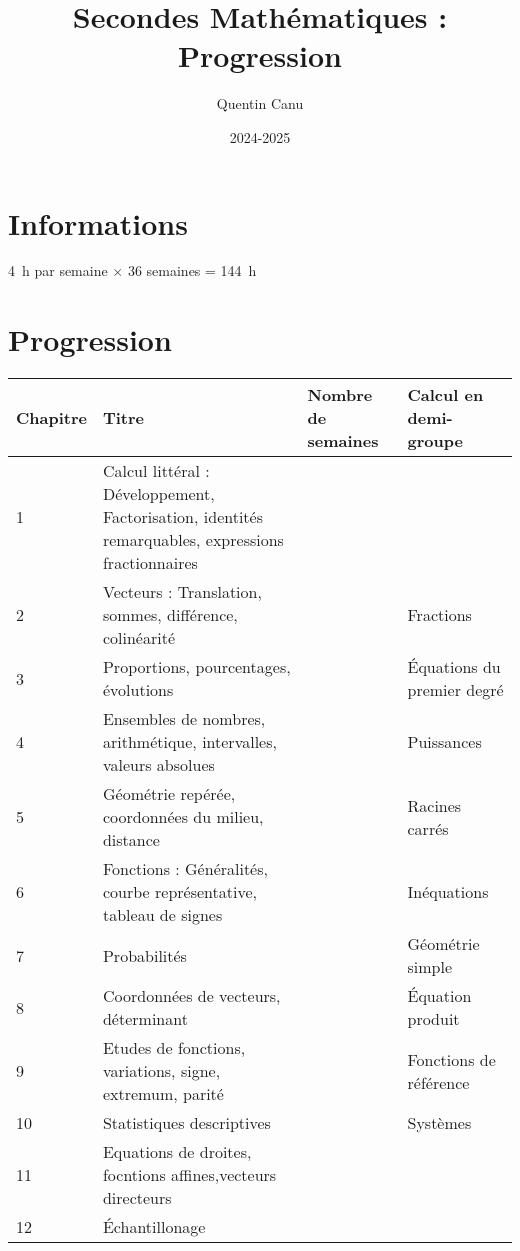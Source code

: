 \documentclass{article}
\title{Secondes Mathématiques : Progression}
\author{Quentin Canu}
\date{2024-2025}
\begin{document}
\maketitle

\section{Informations}

\qty{4}{\hour} par semaine $\times$ 36 semaines = \qty{144}{\hour}

\section{Progression}

\begin{center}
    
\begin{tabular}{|l|p{4cm}|p{2cm}|p{2cm}|}
\hline
Chapitre
    & 
Titre
        & 
Nombre de semaines
            &
Calcul en demi-groupe\\
\hline
1   & 
Calcul littéral : Développement, Factorisation, identités remarquables, expressions fractionnaires
        &
            &
\\
\hline
2   &
Vecteurs : Translation, sommes, différence, colinéarité 
        &

            &
Fractions\\
\hline
3   &
Proportions, pourcentages, évolutions
        &

            &
Équations du premier degré\\
\hline
4   &
Ensembles de nombres, arithmétique, intervalles, valeurs absolues
        &

            &
Puissances\\
\hline
5   &
Géométrie repérée, coordonnées du milieu, distance
        &

            &
Racines carrés\\
\hline
6   &
Fonctions : Généralités, courbe représentative, tableau de signes
        &

            &
Inéquations\\
\hline
7   &
Probabilités
        &

            &
Géométrie simple\\
\hline
8   &
Coordonnées de vecteurs, déterminant
        &

            &
Équation produit\\
\hline
9   &
Etudes de fonctions, variations, signe, extremum, parité
        &

            &
Fonctions de référence\\
\hline
10  &
Statistiques descriptives
        &

            &
Systèmes\\
\hline
11  &
Equations de droites, focntions affines,vecteurs directeurs
        &

            &
\\
\hline
12  &
Échantillonage
        &

            &
\\
\hline
\end{tabular}
\end{center}
\end{document}
